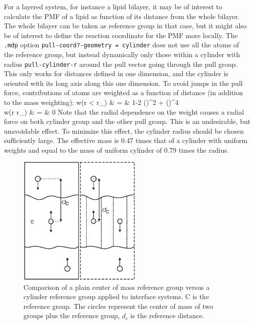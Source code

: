 For a layered system, for instance a lipid bilayer, it may be of interest
to calculate the PMF of a lipid as function of its distance
from the whole bilayer. The whole bilayer can be taken as reference
group in that case, but it might also be of interest to define the
reaction coordinate for the PMF more locally. The {\tt .mdp} option
{\tt pull-coord?-geometry = cylinder} does not
use all the atoms of the reference group, but instead dynamically only those
within a cylinder with radius {\tt pull-cylinder-r} around the pull vector going
through the pull group. This only
works for distances defined in one dimension, and the cylinder is
oriented with its long axis along this one dimension. To avoid jumps in
the pull force, contributions of atoms are weighted as a function of distance
(in addition to the mass weighting):
\bea
w(r < r_) & = &
1-2 \left(\right)^2 + \left(\right)^4 \\
w(r \geq r_) & = & 0
\eea
Note that the radial dependence on the weight causes a radial force on
both cylinder group and the other pull group. This is an undesirable,
but unavoidable effect. To minimize this effect, the cylinder radius should
be chosen sufficiently large. The effective mass is 0.47 times that of
a cylinder with uniform weights and equal to the mass of uniform cylinder
of 0.79 times the radius.

\begin{figure}
\centerline{\includegraphics[width=6cm]{plots/pullref}}
\caption{Comparison of a plain center of mass reference group versus a cylinder
reference group applied to interface systems. C is the reference group.
The circles represent the center of mass of two groups plus the reference group,
$d_c$ is the reference distance.}
\label{fig:pullref} 
\end{figure}   


